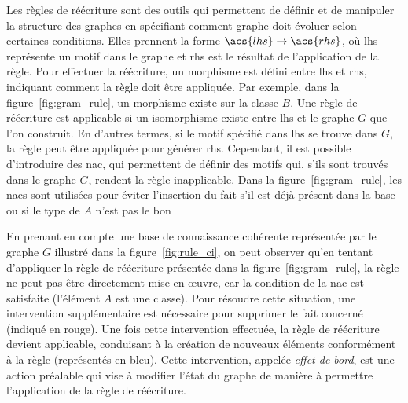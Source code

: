 Les règles de réécriture sont des outils qui permettent de définir et de manipuler la structure des graphes en spécifiant comment graphe doit évoluer selon certaines conditions.
Elles prennent la forme $\acs{lhs} \to \acs{rhs}$, où \gls{lhs} représente un motif dans le graphe et \gls{rhs} est le résultat de l'application de la règle.
Pour effectuer la réécriture, un morphisme est défini entre \gls{lhs} et \gls{rhs}, indiquant comment la règle doit être appliquée.
Par exemple, dans la figure~\ref{fig:gram_rule}, un morphisme existe sur la classe $B$.
Une règle de réécriture est applicable si un isomorphisme existe entre \gls{lhs} et le graphe $G$ que l'on construit.
En d'autres termes, si le motif spécifié dans \gls{lhs} se trouve dans $G$, la règle peut être appliquée pour générer \gls{rhs}.
Cependant, il est possible d'introduire des \gls{nac}, qui permettent de définir des motifs qui, s'ils sont trouvés dans le graphe $G$, rendent la règle inapplicable.
Dans la figure~\ref{fig:gram_rule}, les \gls{nac}s sont utilisées pour éviter l'insertion du fait s'il est déjà présent dans la base ou si le type de $A$ n'est pas le bon

\begin{example}
    En prenant en compte une base de connaissance cohérente représentée par le graphe $G$ illustré dans la figure~\ref{fig:rule_ci}, on peut observer qu'en tentant d'appliquer la règle de réécriture présentée dans la figure~\ref{fig:gram_rule}, la règle ne peut pas être directement mise en œuvre, car la condition de la \gls{nac} est satisfaite (l'élément $A$ est une classe).
    Pour résoudre cette situation, une intervention supplémentaire est nécessaire pour supprimer le fait concerné (indiqué en rouge).
    Une fois cette intervention effectuée, la règle de réécriture devient applicable, conduisant à la création de nouveaux éléments conformément à la règle (représentés en bleu).
    Cette intervention, appelée \emph{effet de bord}, est une action préalable qui vise à modifier l'état du graphe de manière à permettre l'application de la règle de réécriture.
\end{example}

